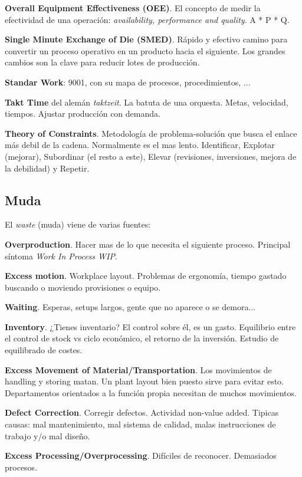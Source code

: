 \documentclass[]{article}
\begin{document}
\textbf{Overall Equipment Effectiveness (OEE)}. El concepto de medir la efectividad de una operación: \textit{availability, performance and quality}. A * P * Q. 

\textbf{Single Minute Exchange of Die (SMED)}. Rápido y efectivo camino para convertir un proceso operativo en un producto hacia el siguiente. Los grandes cambios son la clave para reducir lotes de producción.

\textbf{Standar Work}: 9001, con su mapa de procesos, procedimientos, ...

\textbf{Takt Time} del alemán \textit{taktzeit}. La batuta de una orquesta. Metas, velocidad, tiempos. Ajustar producción con demanda.

\textbf{Theory of Constraints}. Metodología de problema-solución que busca el enlace más debil de la cadena. Normalmente es el mas lento. Identificar, Explotar (mejorar), Subordinar (el resto a este), Elevar (revisiones, inversiones, mejora de la debilidad) y Repetir.

\subsection{Muda}

El \textit{waste} (muda) viene de varias fuentes:

\textbf{Overproduction}. Hacer mas de lo que necesita el siguiente proceso. Principal síntoma \textit{Work In Process WIP}.

\textbf{Excess motion}. Workplace layout. Problemas de ergonomía, tiempo gastado buscando o moviendo provisiones o equipo.

\textbf{Waiting}. Esperas, setups largos, gente que no aparece o se demora...

\textbf{Inventory}. ¿Tienes inventario? El control sobre él, es un gasto. Equilibrio entre el control de stock vs ciclo económico, el retorno de la inversión. Estudio de equilibrado de costes.

\textbf{Excess Movement of Material/Transportation}. Los movimientos de handling y storing matan. Un plant layout bien puesto sirve para evitar esto. Departamentos orientados a la función propia necesitan de muchos movimientos.

\textbf{Defect Correction}. Corregir defectos. Actividad non-value added. Tipicas causas: mal  mantenimiento, mal sistema de calidad, malas instrucciones de trabajo y/o mal diseño. 

\textbf{Excess Processing/Overprocessing}. Difíciles de reconocer. Demasiados procesos. 
\end{document}
